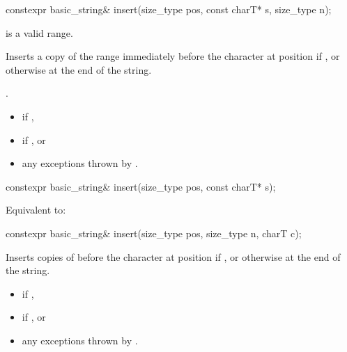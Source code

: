 %
\begin{itemdecl}
constexpr basic_string& insert(size_type pos, const charT* s, size_type n);
\end{itemdecl}

\begin{itemdescr}
\pnum
\expects
{} is a valid range.

\pnum
\effects
Inserts a copy of the range 
immediately before the character at position  if ,
or otherwise at the end of the string.

\pnum
\returns
{}.

\pnum
\throws
\begin{itemize}
\item {} if ,
\item {} if , or
\item any exceptions thrown by .
\end{itemize}
\end{itemdescr}

%
\begin{itemdecl}
constexpr basic_string& insert(size_type pos, const charT* s);
\end{itemdecl}

\begin{itemdescr}
\pnum
\effects
Equivalent to: 
\end{itemdescr}

%
\begin{itemdecl}
constexpr basic_string& insert(size_type pos, size_type n, charT c);
\end{itemdecl}

\begin{itemdescr}
\pnum
\effects
Inserts  copies of  before the character at position 
if ,
or otherwise at the end of the string.

\pnum
\returns
{}

\pnum
\throws
\begin{itemize}
\item {} if ,
\item {} if , or
\item any exceptions thrown by .
\end{itemize}
\end{itemdescr}

